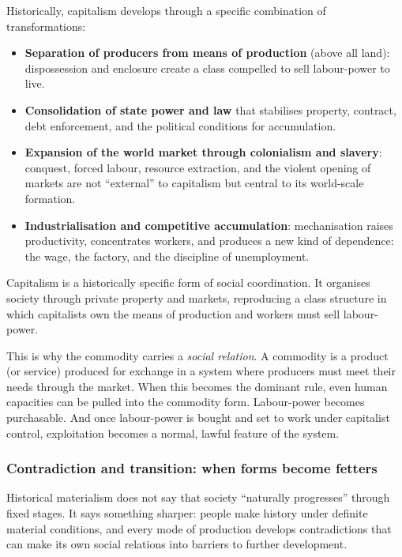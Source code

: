 Historically, capitalism develops through a specific combination of transformations:

\begin{itemize}[leftmargin=1.5em]
  \item \textbf{Separation of producers from means of production} (above all land): dispossession and enclosure create a class compelled
        to sell labour-power to live.\cite{Marx1867,Heller2011}
  \item \textbf{Consolidation of state power and law} that stabilises property, contract, debt enforcement, and the political conditions
        for accumulation.\cite{Marx1859}
  \item \textbf{Expansion of the world market through colonialism and slavery}: conquest, forced labour, resource extraction, and the violent
        opening of markets are not ``external'' to capitalism but central to its world-scale formation.\cite{Marx1867,Beckert2014}
  \item \textbf{Industrialisation and competitive accumulation}: mechanisation raises productivity, concentrates workers, and produces a new
        kind of dependence: the wage, the factory, and the discipline of unemployment.\cite{CambridgeCapitalism1,CambridgeCapitalism2}
\end{itemize}

Capitalism is a historically specific form of social coordination. It organises society
through private property and markets, reproducing a class structure in which capitalists
own the means of production and workers must sell labour-power.

This is why the commodity carries a \emph{social relation}. A commodity is a product (or service) produced for exchange
in a system where producers must meet their needs through the market. When this becomes the dominant rule, even human capacities can be pulled
into the commodity form. Labour-power becomes purchasable. And once labour-power is bought and set to work under capitalist control, exploitation
becomes a normal, lawful feature of the system.

\subsubsection{Contradiction and transition: when forms become fetters}
\label{sec:forms-fetters}

Historical materialism does not say that society ``naturally progresses'' through fixed stages. It says something sharper:
people make history under definite material conditions, and every mode of production develops contradictions that can make its own
social relations into barriers to further development.

